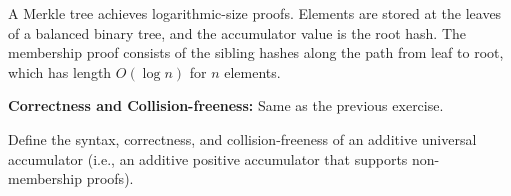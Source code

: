 \ifsolutions
\begin{mysolution}
  A Merkle tree achieves logarithmic-size proofs.
  Elements are stored at the leaves of a balanced binary tree, and the accumulator value is the root hash.
  The membership proof consists of the sibling hashes along the path from leaf to root, which has length $O(\log n)$ for $n$ elements.

  \textbf{Correctness and Collision-freeness:} Same as the previous exercise.
\end{mysolution}
\fi

\begin{exercise}
  Define the syntax, correctness, and collision-freeness of an additive universal accumulator (i.e., an additive positive accumulator that supports non-membership proofs).
\end{exercise}

